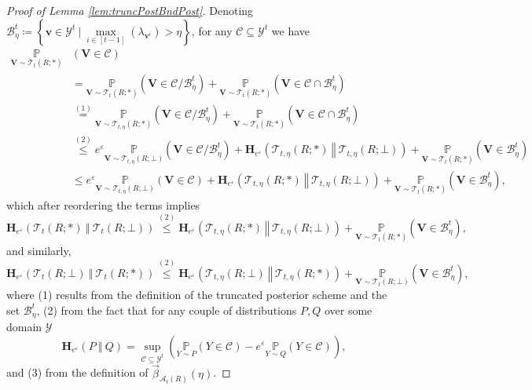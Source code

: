 \documentclass{article}
\theoremstyle{plain}
\theoremstyle{definition}
\newcommand{\eps}{\varepsilon}
\newcommand{\eqExp}[2]{\overset{(#1)}{#2}}
\newcommand{\outRV}{Y}
\newcommand{\outDom}{\mathcal{Y}}
\newcommand{\rand}{R}
\newcommand{\view}{\boldsymbol{v}}
\newcommand{\viewRV}{\boldsymbol{V}}
\newcommand{\prob}[2]{\underset{#1}{\mathbb{P}} \left(#2 \right)}
\newcommand{\HockeyStick}[1]{\boldsymbol{H}_{#1}}
\newcommand{\HockeyStickDiv}[3]{\HockeyStick{#1}\left(#2 ~\left\Vert~ #3 \right. \right)}
\newcommand{\alloc}[2]{\mathcal{A}_{#1}\left(#2\right)}
\newcommand{\postFunc}[3]{\mathcal{T}_{#1}\left(#2; #3\right)}
\newcommand{\rem}[1]{\vec{#1}}
\begin{document}
\begin{proof}[Proof of Lemma \ref{lem:truncPostBndPost}]
    Denoting $\mathcal{B}_{\eta}^{t} \coloneqq \left\{\view \in \outDom^{t} ~ \big \vert ~ \underset{i \in [t-1]}{\max} \left(\lambda_{\view^{i}}\right) > \eta  \right\}$, for any $\mathcal{C} \subseteq \outDom^{t}$ we have
    \begin{align*}
        \underset{\viewRV \sim \postFunc{t}{\rand}{*}}{\mathbb{P}} & (\viewRV \in \mathcal{C})
        \\ & = \prob{\viewRV \sim \postFunc{t}{\rand}{*}}{\viewRV \in \mathcal{C} / \mathcal{B}_{\eta}^{t}} + \prob{\viewRV \sim \postFunc{t}{\rand}{*}}{\viewRV \in \mathcal{C} \cap \mathcal{B}_{\eta}^{t}}
        \\ & \eqExp{1}{=} \prob{\viewRV \sim \postFunc{t, \eta}{\rand}{*}}{\viewRV \in \mathcal{C} / \mathcal{B}_{\eta}^{t}} + \prob{\viewRV \sim \postFunc{t}{\rand}{*}}{\viewRV \in \mathcal{C} \cap \mathcal{B}_{\eta}^{t}}
        \\ & \eqExp{2}{\le} e^{\eps} \prob{\viewRV \sim \postFunc{t, \eta}{\rand}{\bot}}{\viewRV \in \mathcal{C} / \mathcal{B}_{\eta}^{t}} + \HockeyStickDiv{e^{\eps}}{\postFunc{t, \eta}{\rand}{*}}{\postFunc{t, \eta}{\rand}{\bot}} + \prob{\viewRV \sim \postFunc{t}{\rand}{*}}{\viewRV \in \mathcal{B}_{\eta}^{t}}
        \\ & \le e^{\eps} \prob{\viewRV \sim \postFunc{t, \eta}{\rand}{\bot}}{\viewRV \in \mathcal{C}} + \HockeyStickDiv{e^{\eps}}{\postFunc{t, \eta}{\rand}{*}}{\postFunc{t, \eta}{\rand}{\bot}} + \prob{\viewRV \sim \postFunc{t}{\rand}{*}}{\viewRV \in \mathcal{B}_{\eta}^{t}},
    \end{align*}
    which after reordering the terms implies
    \[
        \HockeyStickDiv{e^{\eps}}{\postFunc{t}{\rand}{*}}{\postFunc{t}{\rand}{\bot}} \eqExp{2}{\le} \HockeyStickDiv{e^{\eps}}{\postFunc{t, \eta}{\rand}{*}}{\postFunc{t, \eta}{\rand}{\bot}} + \prob{\viewRV \sim \postFunc{t}{\rand}{*}}{\viewRV \in \mathcal{B}_{\eta}^{t}},
    \]
    and similarly,
    \[
        \HockeyStickDiv{e^{\eps}}{\postFunc{t}{\rand}{\bot}}{\postFunc{t}{\rand}{*}} \eqExp{2}{\le} \HockeyStickDiv{e^{\eps}}{\postFunc{t, \eta}{\rand}{\bot}}{\postFunc{t, \eta}{\rand}{*}} + \prob{\viewRV \sim \postFunc{t}{\rand}{\bot}}{\viewRV \in \mathcal{B}_{\eta}^{t}},
    \]
    where (1) results from the definition of the truncated posterior scheme and the set $\mathcal{B}_{\eta}^{t}$, (2) from the fact that for any couple of distributions $P, Q$ over some domain $\outDom$
    \[
        \HockeyStickDiv{e^{\eps}}{P}{Q} = \underset{\mathcal{C} \subseteq \outDom^{t}}{\sup} \left(\prob{\outRV \sim P}{\outRV \in \mathcal{C}} - e^{\eps} \prob{\outRV \sim Q}{\outRV \in \mathcal{C}} \right),
    \]
    and (3) from the definition of $\rem{\beta}_{\alloc{t}{\rand}} (\eta)$.


\end{proof}
\end{document}
